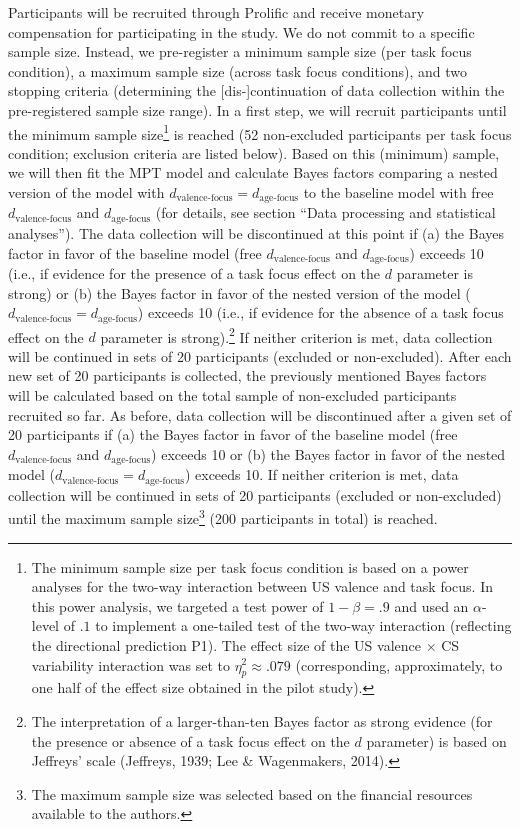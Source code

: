 \documentclass[
  doc,floatsintext]{apa6}
\begin{document}
Participants will be recruited through Prolific and receive monetary compensation for participating in the study.
We do not commit to a specific sample size.
Instead, we pre-register a minimum sample size (per task focus condition), a maximum sample size (across task focus conditions), and two stopping criteria (determining the {[}dis-{]}continuation of data collection within the pre-registered sample size range).
In a first step, we will recruit participants until the minimum sample size\footnote{The minimum sample size per task focus condition is based on a power analyses for the two-way interaction between US valence and task focus. In this power analysis, we targeted a test power of \(1-\beta=.9\) and used an \(\alpha\)-level of \(.1\) to implement a one-tailed test of the two-way interaction (reflecting the directional prediction P1). The effect size of the US valence \(\times\) CS variability interaction was set to \(\eta^2_{p}\approx.079\) (corresponding, approximately, to one half of the effect size obtained in the pilot study).} is reached (52 non-excluded participants per task focus condition; exclusion criteria are listed below).
Based on this (minimum) sample, we will then fit the MPT model and calculate Bayes factors comparing a nested version of the model with \(d_\textrm{valence-focus}=d_\textrm{age-focus}\) to the baseline model with free \(d_\textrm{valence-focus}\) and \(d_\textrm{age-focus}\) (for details, see section ``Data processing and statistical analyses'').
The data collection will be discontinued at this point if (a) the Bayes factor in favor of the baseline model (free \(d_\textrm{valence-focus}\) and \(d_\textrm{age-focus}\)) exceeds 10 (i.e., if evidence for the presence of a task focus effect on the \(d\) parameter is strong) or (b)
the Bayes factor in favor of the nested version of the model (\(d_\textrm{valence-focus}=d_\textrm{age-focus}\)) exceeds 10 (i.e., if evidence for the absence of a task focus effect on the \(d\) parameter is strong).\footnote{The interpretation of a larger-than-ten Bayes factor as strong evidence (for the presence or absence of a task focus effect on the \(d\) parameter) is based on Jeffreys' scale (Jeffreys, 1939; Lee \& Wagenmakers, 2014).}
If neither criterion is met, data collection will be continued in sets of 20 participants (excluded or non-excluded).
After each new set of 20 participants is collected, the previously mentioned Bayes factors will be calculated based on the total sample of non-excluded participants recruited so far.
As before, data collection will be discontinued after a given set of 20 participants if (a) the Bayes factor in favor of the baseline model (free \(d_\textrm{valence-focus}\) and \(d_\textrm{age-focus}\)) exceeds 10 or (b)
the Bayes factor in favor of the nested model (\(d_\textrm{valence-focus}=d_\textrm{age-focus}\)) exceeds 10.
If neither criterion is met, data collection will be continued in sets of 20 participants (excluded or non-excluded) until the maximum sample size\footnote{The maximum sample size was selected based on the financial resources available to the authors.} (200 participants in total) is reached.
\end{document}

